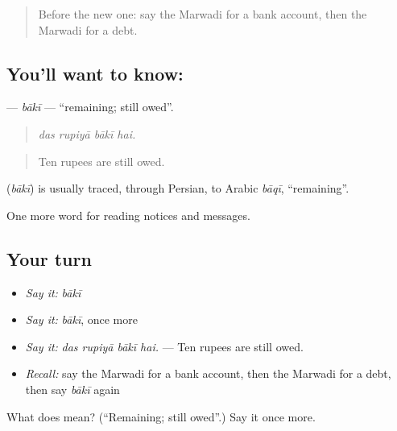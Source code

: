 \label{lesson:MW-C195-baki}



\begin{quote}
Before the new one: say the Marwadi for a bank account, then the Marwadi for a debt.
\end{quote}

\subsection*{You'll want to know: }
\textbf{} — \emph{bākī} — \textquotedblleft{}remaining; still owed\textquotedblright{}.

\begin{quote}
   
\end{quote}

\begin{quote}
\emph{das rupiyā bākī hai.}
\end{quote}

\begin{quote}
Ten rupees are still owed.
\end{quote}

\begin{cousinweb}
\textbf{} (\emph{bākī}) is usually traced, through Persian, to Arabic \emph{bāqī}, \textquotedblleft{}remaining\textquotedblright{}.
\end{cousinweb}

\begin{grammarlens}[title={What you've built}]
One more word for reading notices and messages.
\end{grammarlens}

\subsection*{Your turn}
\begin{itemize}
\raggedright
  \item \emph{Say it:} \emph{bākī}
  \item \emph{Say it:} \emph{bākī}, once more
  \item \emph{Say it:} \emph{das rupiyā bākī hai.} — Ten rupees are still owed.
  \item \emph{Recall:} say the Marwadi for a bank account, then the Marwadi for a debt, then say \emph{bākī} again
\end{itemize}

\begin{tcolorbox}[breakable,colback=teal!4,colframe=teal!35!black,title={Before you move on}]
What does  mean? (\textquotedblleft{}Remaining; still owed\textquotedblright{}.) Say it once more.
\end{tcolorbox}
